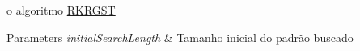 
\begin{DoxyRefList}
\item[\label{todo__todo000001}%
\hypertarget{todo__todo000001}{}%
Member \hyperlink{classRKRGST_a2a1e36e5cea3e1b3cd573dbaeceff4f4}{R\+K\+R\+G\+S\+T$<$ Type\+Of\+Content $>$\+:\+:execute} (int initial\+Search\+Length)]o algoritmo \hyperlink{classRKRGST}{R\+K\+R\+G\+S\+T} 
\begin{DoxyParams}{Parameters}
{\em initial\+Search\+Length} & Tamanho inicial do padrão buscado \\
\hline
\end{DoxyParams}

\end{DoxyRefList}